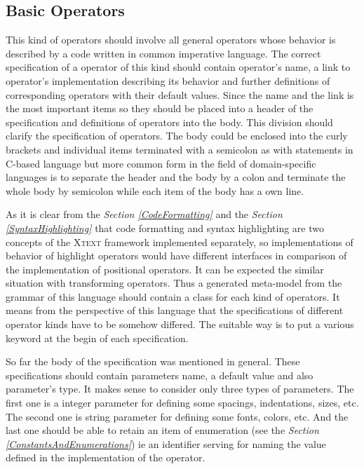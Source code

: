 \documentclass[12pt,notitlepage,a4paper]{report}
\begin{document}
\subsection{Basic Operators}
\label{BasicOperators}
This kind of operators should involve all general operators whose behavior is described by a code written in common imperative language. The correct specification of a operator of this kind should contain operator's name, a link to operator's implementation describing its behavior and further definitions of corresponding operators with their default values. Since the name and the link is the most important items so they should be placed into a header of the specification and definitions of operators into the body. This division should clarify the specification of operators. The body could be enclosed into the curly brackets and individual items terminated with a semicolon as with statements in C-based language but more common form in the field of domain-specific languages is to separate the header and the body by a colon and terminate the whole body by semicolon while each item of the body has a own line.

As it is clear from the \textit{Section \ref{CodeFormatting}} and the \textit{Section \ref{SyntaxHighlighting}} that code formatting and syntax highlighting are two concepts of the \textsc{Xtext} framework implemented separately, so implementations of behavior of highlight operators would have different interfaces in comparison of the implementation of positional operators. It can be expected the similar situation with transforming operators. Thus a generated meta-model from the grammar of this language should contain a class for each kind of operators. It means from the perspective of this language that the specifications of different operator kinds have to be somehow differed.  The suitable way is to put a various keyword at the begin of each specification.

So far the body of the specification was mentioned in general. These specifications should contain parameters name, a default value and also parameter's type. It makes sense to consider only three types of parameters. The first one is a integer parameter for defining some spacings, indentations, sizes, etc. The second one is string parameter for defining some fonts, colors, etc. And the last one should be able to retain an item of enumeration (see the \textit{Section \ref{ConstantsAndEnumerations}}) ie an identifier serving for naming the value defined in the implementation of the operator.
\end{document}
